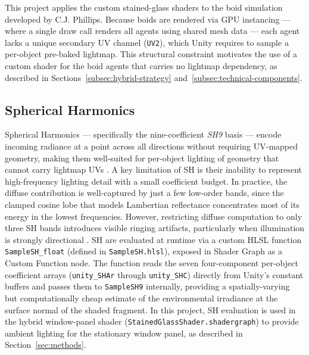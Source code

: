 \documentclass[12pt]{article}
\begin{document}
This project applies the custom stained-glass shaders to the boid simulation developed by C.J. Phillips. Because boids are rendered via GPU instancing --- where a single draw call renders all agents using shared mesh data --- each agent lacks a unique secondary UV channel (\texttt{UV2}), which Unity requires to sample a per-object pre-baked lightmap. This structural constraint motivates the use of a custom shader for the boid agents that carries no lightmap dependency, as described in Sections~\ref{subsec:hybrid-strategy} and~\ref{subsec:technical-components}.


\subsection{Spherical Harmonics}
Spherical Harmonics --- specifically the nine-coefficient \emph{SH9} basis --- encode incoming radiance at a point across all directions without requiring UV-mapped geometry, making them well-suited for per-object lighting of geometry that cannot carry lightmap UVs \cite{Green2003}.
A key limitation of SH is their inability to represent high-frequency lighting detail with a small coefficient budget. In practice, the diffuse contribution is well-captured by just a few low-order bands, since the clamped cosine lobe that models Lambertian reflectance concentrates most of its energy in the lowest frequencies. However, restricting diffuse computation to only three SH bands introduces visible ringing artifacts, particularly when illumination is strongly directional \cite{Mezieres2021}.
SH are evaluated at runtime via a custom HLSL function \texttt{SampleSH\_float} (defined in \texttt{SampleSH.hlsl}), exposed in Shader Graph as a Custom Function node. The function reads the seven four-component per-object coefficient arrays (\texttt{unity\_SHAr} through \texttt{unity\_SHC}) directly from Unity's constant buffers and passes them to \texttt{SampleSH9} internally, providing a spatially-varying but computationally cheap estimate of the environmental irradiance at the surface normal of the shaded fragment. In this project, SH evaluation is used in the hybrid window-panel shader (\texttt{StainedGlassShader.shadergraph}) to provide ambient lighting for the stationary window panel, as described in Section~\ref{sec:methods}.

\end{document}
